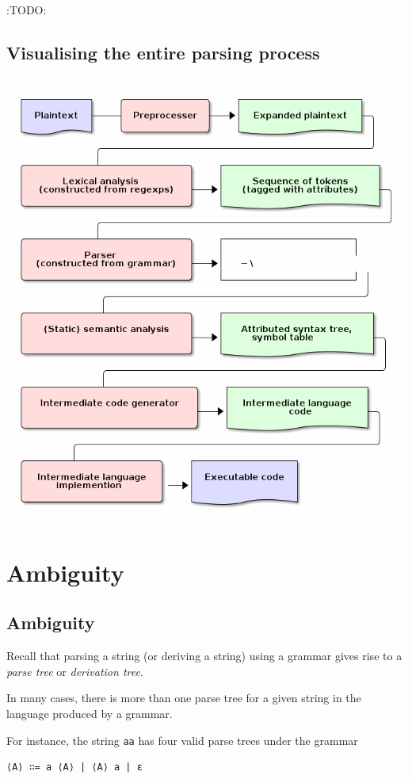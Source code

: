 \documentclass[11pt]{article}
\theoremstyle{definition}
\begin{document}
:TODO:

\subsection{Visualising the entire parsing process}
\label{sec:org1844741}

\includegraphics{media/parsing-whole.png}

\section{Ambiguity}
\label{sec:orgc3d0a3c}

\subsection{Ambiguity}
\label{sec:orgc023ab2}

Recall that parsing a string (or deriving a string)
using a grammar gives rise to a \emph{parse tree} or \emph{derivation tree}.

In many cases, there is more than one parse tree
for a given string in the language produced by a grammar.

For instance, the string \texttt{aa} has four valid parse trees
under the grammar
\begin{verbatim}
⟨A⟩ ∷= a ⟨A⟩ | ⟨A⟩ a | ε 
\end{verbatim}
\end{document}
